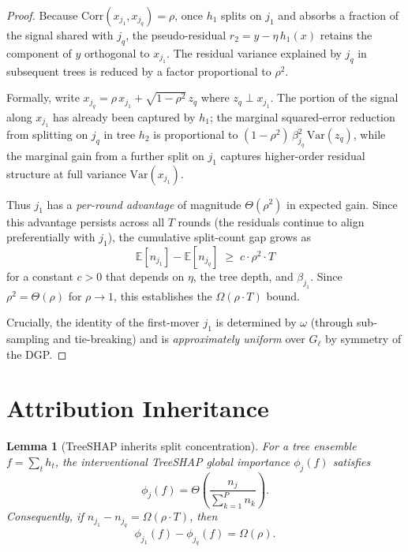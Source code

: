 \documentclass[11pt]{article}
\newtheorem{lemma}[theorem]{Lemma}
\theoremstyle{remark}
\newcommand{\Gl}{G_\ell}                    %
\newcommand{\phij}{\phi_j}                  %
\newcommand{\splits}[1]{n_{#1}}             %
\newcommand{\totalT}{T}                     %
\newcommand{\rhovar}{\rho}                  %
\newcommand{\Exp}{\mathbb{E}}              %
\newcommand{\Var}{\mathrm{Var}}            %
\begin{document}
\begin{proof}
Because $\mathrm{Corr}(x_{j_1}, x_{j_q}) = \rhovar$, once $h_1$ splits on
$j_1$ and absorbs a fraction of the signal shared with $j_q$, the
pseudo-residual $r_2 = y - \eta\, h_1(x)$ retains the component of $y$
orthogonal to $x_{j_1}$.  The residual variance explained by $j_q$ in
subsequent trees is reduced by a factor proportional to $\rhovar^2$.

Formally, write $x_{j_q} = \rhovar\, x_{j_1} + \sqrt{1-\rhovar^2}\, z_q$
where $z_q \perp x_{j_1}$.  The portion of the signal along $x_{j_1}$
has already been captured by $h_1$; the marginal squared-error reduction
from splitting on $j_q$ in tree $h_2$ is proportional to
$(1 - \rhovar^2)\, \beta_{j_q}^2\, \Var(z_q)$,
while the marginal gain from a further split on $j_1$ captures
higher-order residual structure at full variance $\Var(x_{j_1})$.

Thus $j_1$ has a \emph{per-round advantage} of magnitude
$\Theta(\rhovar^2)$ in expected gain.
Since this advantage persists across all $\totalT$ rounds (the residuals
continue to align preferentially with $j_1$), the cumulative split-count
gap grows as
\begin{equation}
  \Exp[\splits{j_1}] - \Exp[\splits{j_q}]
    \;\geq\; c \cdot \rhovar^2 \cdot \totalT
\end{equation}
for a constant $c > 0$ that depends on $\eta$, the tree depth, and
$\beta_{j_1}$.  Since $\rhovar^2 = \Theta(\rhovar)$ for
$\rhovar \to 1$, this establishes the $\Omega(\rhovar \cdot \totalT)$
bound.

Crucially, the identity of the first-mover $j_1$ is determined by
$\omega$ (through sub-sampling and tie-breaking) and is
\emph{approximately uniform} over $\Gl$ by symmetry of the DGP.
\end{proof}


\section{Attribution Inheritance}
\label{sec:attribution}

\begin{lemma}[TreeSHAP inherits split concentration]
\label{lem:shap-inherits}
For a tree ensemble $f = \sum_{t} h_t$, the interventional TreeSHAP
global importance $\phij(f)$ satisfies
\begin{equation}
  \phij(f) = \Theta\!\left(
    \frac{\splits{j}}{\sum_{k=1}^{P} \splits{k}}
  \right).
  \label{eq:shap-splits}
\end{equation}
Consequently, if $\splits{j_1} - \splits{j_q} = \Omega(\rhovar \cdot
\totalT)$, then
\begin{equation}
  \phi_{j_1}(f) - \phi_{j_q}(f) = \Omega(\rhovar).
  \label{eq:shap-gap}
\end{equation}
\end{lemma}
\end{document}
